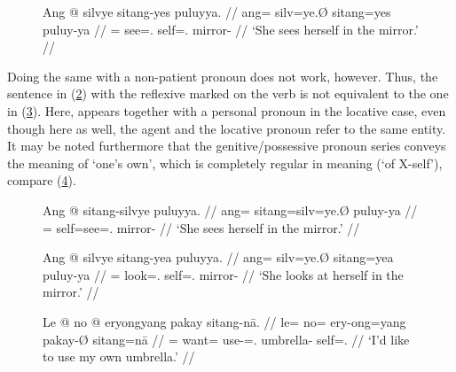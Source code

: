 \begin{figure}
\ex\label{ex:reflpat}\begingl
	\gla Ang @ silvye sitang-yes puluyya. //
	\glb ang= silv=ye.Ø sitang=yes puluy-ya //
	\glc \AgtT{}= see=\TsgF{}.\Top{} self=\TsgF{}.\Parg{} mirror-\Loc{} //
	\glft `She sees herself in the mirror.' //
\endgl\xe
\end{figure}

Doing the same with a non-patient pronoun does not work, however. Thus, the
sentence in (\ref{ex:reflvb}) with the reflexive  marked
on the verb is not equivalent to the one in (\ref{ex:reflloc}). Here,
 appears together with a personal pronoun in the locative
case, even though here as well, the agent and the locative pronoun refer to the
same entity. It may be noted furthermore that the genitive/possessive pronoun
series conveys the meaning of `one's own', which is completely regular in
meaning (`of X-self'), compare (\ref{ex:emphposs}).

\begin{figure}
\ex\label{ex:reflvb}\begingl
	\gla Ang @ sitang-silvye puluyya. //
	\glb ang= sitang=silv=ye.Ø puluy-ya //
	\glc \AgtT{}= self=see=\TsgF{}.\Top{} mirror-\Loc{} //
	\glft `She sees herself in the mirror.' //
\endgl\xe
\end{figure}

\begin{figure}
\ex\label{ex:reflloc}\begingl
	\gla Ang @ silvye sitang-yea puluyya. //
	\glb ang= silv=ye.Ø sitang=yea puluy-ya //
	\glc \AgtT{}= look=\TsgF{}.\Top{} self=\TsgF{}.\Loc{} mirror-\Loc{} //
	\glft `She looks at herself in the mirror.' //
\endgl\xe
\end{figure}

\begin{figure}
\ex\label{ex:emphposs}%
\begingl
	\gla Le @ no @ eryongyang pakay sitang-nā. //
	\glb le= no= ery-ong=yang pakay-Ø sitang=nā //
	\glc \PatTI{}= want= use-\Irr{}=\Fsg{}.\Aarg{} umbrella-\Top{} 
		self=\Fsg{}.\Gen{} //
	\glft `I'd like to use my own umbrella.' //
\endgl\xe
\end{figure}


